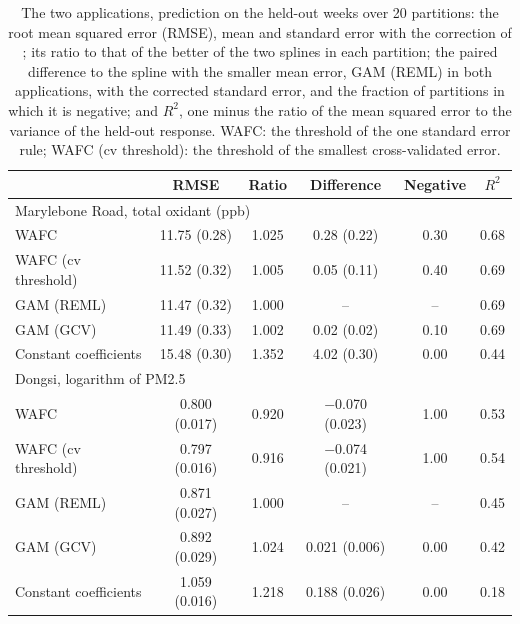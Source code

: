 \begin{table}[tp]
\color{colR1}
\caption{The two applications, prediction on the held-out weeks over 20
partitions: the root mean squared error (RMSE), mean and standard error with
the correction of \citet{Nadeau-Bengio-2003}; its ratio to that of the better
of the two splines in each partition; the paired difference to the spline
with the smaller mean error, GAM (REML) in both applications, with the
corrected standard error, and the fraction of partitions in which it is
negative; and $R^2$, one minus the ratio of the mean squared error to the
variance of the held-out response. WAFC: the threshold of the one standard
error rule; WAFC (cv threshold): the threshold of the smallest
cross-validated error.}
\label{tab:app-prediction}
\centering
\small
\begin{tabular}{lccccc}
\hline
 & RMSE & Ratio & Difference & Negative & $R^2$ \\
\hline
\multicolumn{6}{l}{Marylebone Road, total oxidant (ppb)} \\
WAFC & 11.75 (0.28) & 1.025 & 0.28 (0.22) & 0.30 & 0.68 \\
WAFC (cv threshold) & 11.52 (0.32) & 1.005 & 0.05 (0.11) & 0.40 & 0.69 \\
GAM (REML) & 11.47 (0.32) & 1.000 & -- & -- & 0.69 \\
GAM (GCV) & 11.49 (0.33) & 1.002 & 0.02 (0.02) & 0.10 & 0.69 \\
Constant coefficients & 15.48 (0.30) & 1.352 & 4.02 (0.30) & 0.00 & 0.44 \\
\hline
\multicolumn{6}{l}{Dongsi, logarithm of PM2.5} \\
WAFC & 0.800 (0.017) & 0.920 & $-$0.070 (0.023) & 1.00 & 0.53 \\
WAFC (cv threshold) & 0.797 (0.016) & 0.916 & $-$0.074 (0.021) & 1.00 & 0.54 \\
GAM (REML) & 0.871 (0.027) & 1.000 & -- & -- & 0.45 \\
GAM (GCV) & 0.892 (0.029) & 1.024 & 0.021 (0.006) & 0.00 & 0.42 \\
Constant coefficients & 1.059 (0.016) & 1.218 & 0.188 (0.026) & 0.00 & 0.18 \\
\hline
\end{tabular}
\end{table}
